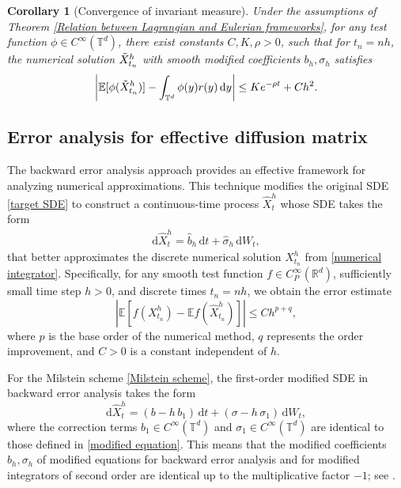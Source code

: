 \documentclass[12pt,a4paper,reqno]{amsart}
\newtheorem{corollary}{Corollary}[section]
\numberwithin{equation}{section}
\begin{document}
\begin{corollary}[Convergence of invariant measure]\label{Convergence of invariant measure}
    Under the assumptions of Theorem \ref{Relation between Lagrangian and Eulerian frameworks}, for any test function $\phi \in C^\infty(\mathbb{T}^d)$, there exist constants $C,K,\rho>0$, such that for $t_n = nh$, the numerical solution $\Tilde{X}_{t_n}^h$ with smooth modified coefficients $b_h,\sigma_h$ satisfies
    \begin{equation*}
        \left| \mathbb{E}[\phi(\Tilde{X}^h_{t_n})] - \int_{\mathbb{T}^d} \phi(y)r(y)\, \mathrm{d}y \right| \le K e^{-\rho t} + Ch^2.
    \end{equation*}
\end{corollary}  


\subsection{Error analysis for effective diffusion matrix}

The backward error analysis approach \cite{Rei99} provides an effective framework for analyzing numerical approximations. This technique modifies the original SDE \eqref{target SDE} to construct a continuous-time process $\hat{X}^h_t$ whose SDE takes the form
\begin{align*}
    \mathrm{d}\hat{X}^h_t = \hat{b}_h\,\mathrm{d}t + \hat{\sigma}_h\,\mathrm{d}W_t,
\end{align*}
that better approximates the discrete numerical solution $X^h_{t_n}$ from \eqref{numerical integrator}. Specifically, for any smooth test function $f\in C_P^{\infty}(\mathbb{R}^d)$, sufficiently small time step $h>0$, and discrete times $t_n = nh$, we obtain the error estimate
\begin{equation}\label{BAE err}
    \left|\mathbb{E}[f(X^h_{t_n}) - \mathbb{E}f(\hat{X}^h_{t_n})]\right| \le C h^{p+q},
\end{equation}
where $p$ is the base order of the numerical method, $q$ represents the order improvement, and $C >0$ is a constant independent of $h$.

For the Milstein scheme \eqref{Milstein scheme}, the first-order modified SDE in backward error analysis \cite{DF12} takes the form 
\begin{equation*}
    \mathrm{d}\hat{X}^h_t = (b - h\,b_1)\,\mathrm{d}t + (\sigma - h\,\sigma_1 )\,\mathrm{d}W_t,
\end{equation*}
where the correction terms $b_1\in C^{\infty}(\mathbb{T}^d)$ and $\sigma_1\in C^{\infty}(\mathbb{T}^d)$ are identical to those defined in \eqref{modified equation}. This means that the modified coefficients $b_{h},\sigma_{h}$ of modified equations for backward error analysis and for modified integrators of second order are identical up to the multiplicative factor $-1$; see \cite{ACV12}.
 
\end{document}
